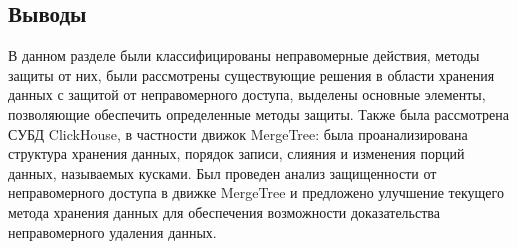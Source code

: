 \subsection{Выводы}

В данном разделе были классифицированы неправомерные действия, методы защиты от них, были рассмотрены существующие решения в области хранения данных с защитой от неправомерного доступа, выделены основные элементы, позволяющие обеспечить определенные методы защиты. Также была рассмотрена СУБД ClickHouse, в частности движок MergeTree: была проанализирована структура хранения данных, порядок записи, слияния и изменения порций данных, называемых кусками. Был проведен анализ защищенности от неправомерного доступа в движке MergeTree и предложено улучшение текущего метода хранения данных для обеспечения возможности доказательства неправомерного удаления данных.

\pagebreak